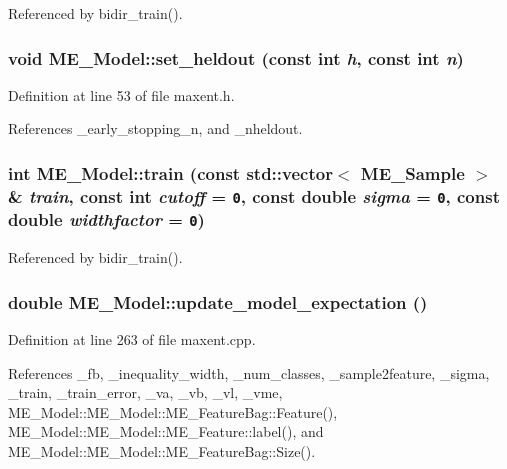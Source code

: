 Referenced by bidir\_\-train().\hypertarget{classME__Model_3968368d934b31e0a541654f64513ad6}{
\subsubsection[{set\_\-heldout}]{\setlength{\rightskip}{0pt plus 5cm}void ME\_\-Model::set\_\-heldout (const int {\em h}, \/  const int {\em n})}}
\label{classME__Model_3968368d934b31e0a541654f64513ad6}




Definition at line 53 of file maxent.h.

References \_\-early\_\-stopping\_\-n, and \_\-nheldout.\hypertarget{classME__Model_246ff3f37fbee3abf4bef0f978bd031e}{
\subsubsection[{train}]{\setlength{\rightskip}{0pt plus 5cm}int ME\_\-Model::train (const std::vector$<$ {\bf ME\_\-Sample} $>$ \& {\em train}, \/  const int {\em cutoff} = {\tt 0}, \/  const double {\em sigma} = {\tt 0}, \/  const double {\em widthfactor} = {\tt 0})}}
\label{classME__Model_246ff3f37fbee3abf4bef0f978bd031e}




Referenced by bidir\_\-train().\hypertarget{classME__Model_d21f4e1132f6d710d41d4b3ef206d1f2}{
\subsubsection[{update\_\-model\_\-expectation}]{\setlength{\rightskip}{0pt plus 5cm}double ME\_\-Model::update\_\-model\_\-expectation ()}}
\label{classME__Model_d21f4e1132f6d710d41d4b3ef206d1f2}




Definition at line 263 of file maxent.cpp.

References \_\-fb, \_\-inequality\_\-width, \_\-num\_\-classes, \_\-sample2feature, \_\-sigma, \_\-train, \_\-train\_\-error, \_\-va, \_\-vb, \_\-vl, \_\-vme, ME\_\-Model::ME\_\-Model::ME\_\-FeatureBag::Feature(), ME\_\-Model::ME\_\-Model::ME\_\-Feature::label(), and ME\_\-Model::ME\_\-Model::ME\_\-FeatureBag::Size().

